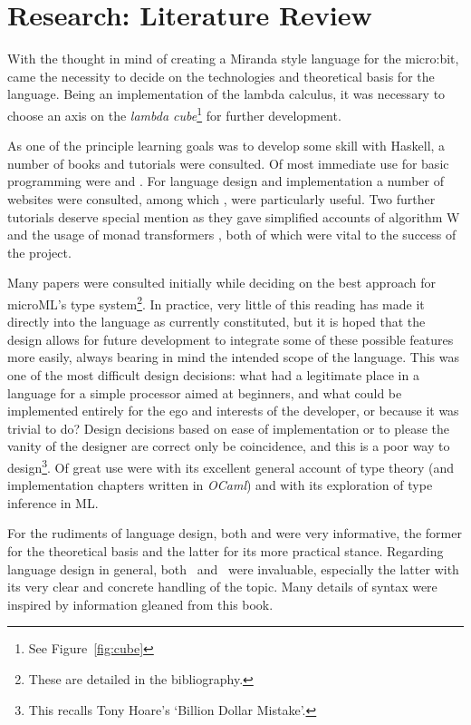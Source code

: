 \documentclass[12pt, a4paper]{report}
\begin{document}
\section{Research: Literature Review}
With the thought in mind of creating a Miranda style language for the micro:bit, came the necessity
to decide on the technologies and theoretical basis for the language. Being an implementation of the
lambda calculus, it was necessary to choose an axis on the \textit{lambda cube}\footnote{See
Figure~\ref{fig:cube}} for further development. 

As one of the principle learning goals was to develop some skill with Haskell, a number of books and
tutorials were consulted. Of most immediate use for basic programming were \cite{Lipovaca:2011:LYH:2018642}
and \cite{rwh}. For language design and implementation a number of websites were consulted, among which
\cite{scheme}, \cite{diehl} were particularly useful. Two further tutorials deserve special mention
as they gave simplified accounts of algorithm W \cite{algoW} and the usage of monad transformers
\cite{transformers}, both of which were vital to the success of the project.

Many papers were consulted initially while deciding on the best approach for microML's type
system\footnote{These are detailed in the bibliography.}. In practice, very little of this
reading has made it directly into the language as currently constituted, but it is hoped that the
design allows for future development to integrate some of these possible features more easily,
always bearing in mind the intended scope of the language. This was one of the most difficult
design decisions: what had a legitimate place in a language for a simple processor aimed at
beginners, and what could be implemented entirely for the ego and interests of the developer, or because it
was trivial to do? Design decisions based on ease of implementation or to please the vanity of the
designer are correct only be coincidence, and this is a poor way to design\footnote{This recalls
Tony Hoare's `Billion Dollar Mistake'.}. Of great use were \cite{Pierce:2002:TPL:509043} with its
excellent general account of type theory (and implementation chapters written in \textit{OCaml})
and\@\cite{Pierce:2004:ATT:1076265} with its exploration of type inference in ML\@.

For the rudiments of language design, both\@\cite{spj2} and\@\cite{spj1} were very informative, the
former for the theoretical basis and the latter for its more practical stance. Regarding language
design in general, both~\cite{Harper:2012:PFP:2431407} and~\cite{plp} were invaluable, especially
the latter with its very clear and concrete handling of the topic. Many details of syntax were
inspired by information gleaned from this book.
\end{document}

